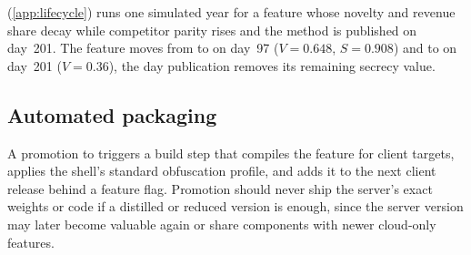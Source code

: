  (\cref{app:lifecycle}) runs one simulated year for a feature whose
novelty and revenue share decay while competitor parity rises and the method is published on
day~201. The feature moves from  to  on day~97
(\(V = 0.648\), \(S = 0.908\)) and to  on day~201 (\(V = 0.36\)), the day
publication removes its remaining secrecy value.

\subsection{Automated packaging}
A promotion to  triggers a build step that compiles the feature for client
targets, applies the shell's standard obfuscation profile, and adds it to the next client
release behind a feature flag. Promotion should never ship the server's exact weights or code
if a distilled or reduced version is enough, since the server version may later become
valuable again or share components with newer cloud-only features.
